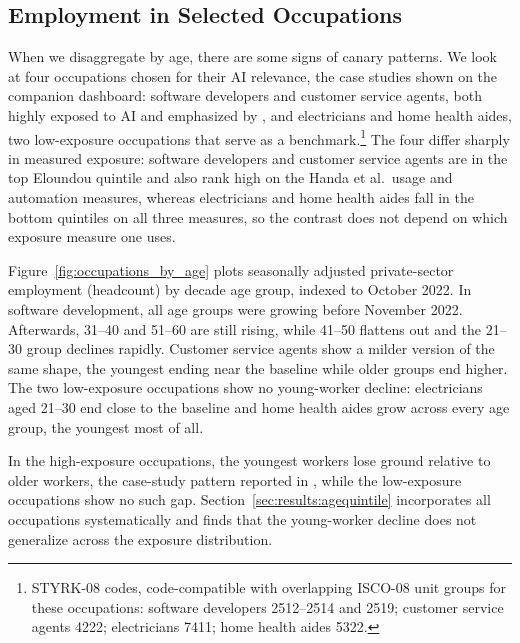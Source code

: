 \documentclass[12pt]{article}
\begin{document}
\subsection{Employment in Selected Occupations}\label{sec:results:occupations}

When we disaggregate by age, there are some signs of canary patterns. We look at four occupations chosen for their AI relevance, the case studies shown on the companion dashboard: software developers and customer service agents, both highly exposed to AI and emphasized by \citet{brynjolfsson2025}, and electricians and home health aides, two low-exposure occupations that serve as a benchmark.\footnote{STYRK-08 codes, code-compatible with overlapping ISCO-08 unit groups for these occupations: software developers 2512--2514 and 2519; customer service agents 4222; electricians 7411; home health aides 5322.} The four differ sharply in measured exposure: software developers and customer service agents are in the top Eloundou quintile and also rank high on the Handa et al.\ usage and automation measures, whereas electricians and home health aides fall in the bottom quintiles on all three measures, so the contrast does not depend on which exposure measure one uses.

Figure~\ref{fig:occupations_by_age} plots seasonally adjusted private-sector employment (headcount) by decade age group, indexed to October 2022. In software development, all age groups were growing before November 2022. Afterwards, 31--40 and 51--60 are still rising, while 41--50 flattens out and the 21--30 group declines rapidly. Customer service agents show a milder version of the same shape, the youngest ending near the baseline while older groups end higher. The two low-exposure occupations show no young-worker decline: electricians aged 21--30 end close to the baseline and home health aides grow across every age group, the youngest most of all.

In the high-exposure occupations, the youngest workers lose ground relative to older workers, the case-study pattern reported in \citet{brynjolfsson2025}, while the low-exposure occupations show no such gap. Section~\ref{sec:results:agequintile} incorporates all occupations systematically and finds that the young-worker decline does not generalize across the exposure distribution.
\end{document}
